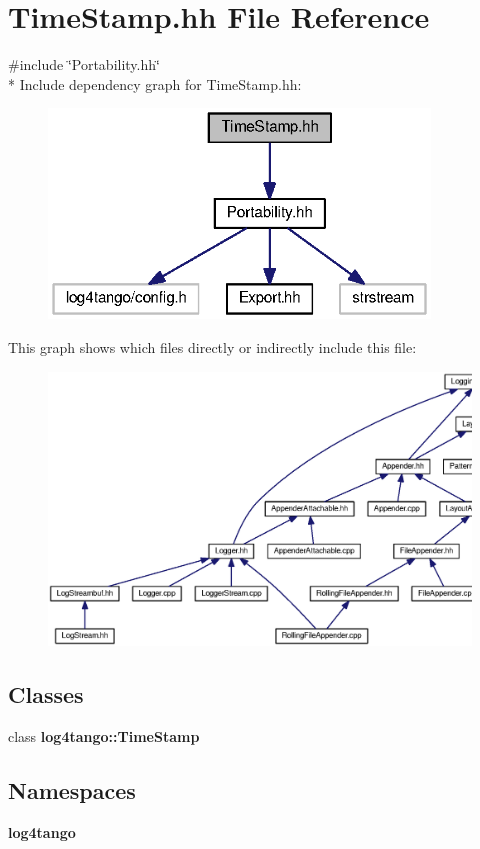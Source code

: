 \section{Time\-Stamp.\-hh File Reference}
\label{TimeStamp_8hh}
{\ttfamily \#include \char`\"{}Portability.\-hh\char`\"{}}\\*
Include dependency graph for Time\-Stamp.\-hh\-:
\nopagebreak
\begin{figure}[H]
\begin{center}
\leavevmode
\includegraphics[width=287pt]{d0/d27/TimeStamp_8hh__incl}
\end{center}
\end{figure}
This graph shows which files directly or indirectly include this file\-:
\nopagebreak
\begin{figure}[H]
\begin{center}
\leavevmode
\includegraphics[width=350pt]{d0/d92/TimeStamp_8hh__dep__incl}
\end{center}
\end{figure}
\subsection*{Classes}
\begin{DoxyCompactItemize}
\item 
class {\bf log4tango\-::\-Time\-Stamp}
\end{DoxyCompactItemize}
\subsection*{Namespaces}
\begin{DoxyCompactItemize}
\item 
{\bf log4tango}
\end{DoxyCompactItemize}

